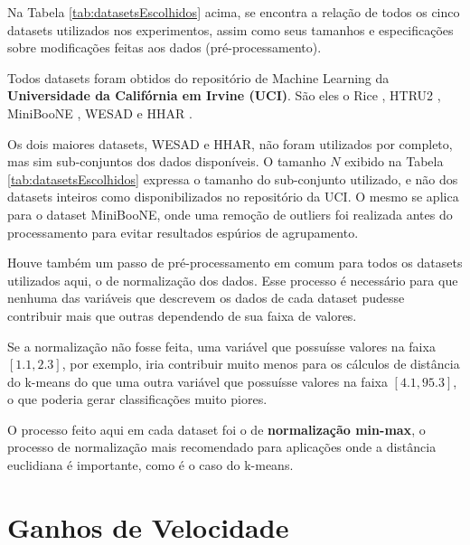 \documentclass[12pt,
openright, 
oneside, %
a4paper,    %
brazil]{facom-ufu-abntex2}
\begin{document}
Na Tabela \ref{tab:datasetsEscolhidos} acima, se encontra a relação de todos os cinco datasets utilizados nos experimentos, assim como seus tamanhos e especificações sobre modificações feitas aos dados (pré-processamento).

Todos datasets foram obtidos do repositório de Machine Learning da \textbf{Universidade da Califórnia em Irvine (UCI)}. São eles o Rice \cite{riceDataset}, HTRU2 \cite{htru2Dataset}, MiniBooNE \cite{minibooneDataset}, WESAD \cite{wesadDataset} e HHAR \cite{htru2Dataset}.

Os dois maiores datasets, WESAD e HHAR, não foram utilizados por completo, mas sim sub-conjuntos dos dados disponíveis. O tamanho $N$ exibido na Tabela \ref{tab:datasetsEscolhidos} expressa o tamanho do sub-conjunto utilizado, e não dos datasets inteiros como disponibilizados no repositório da UCI. O mesmo se aplica para o dataset MiniBooNE, onde uma remoção de outliers foi realizada antes do processamento para evitar resultados espúrios de agrupamento.

Houve também um passo de pré-processamento em comum para todos os datasets utilizados aqui, o de normalização dos dados. Esse processo é necessário para que nenhuma das variáveis que descrevem os dados de cada dataset pudesse contribuir mais que outras dependendo de sua faixa de valores.

Se a normalização não fosse feita, uma variável que possuísse valores na faixa $[1.1, 2.3]$, por exemplo, iria contribuir muito menos para os cálculos de distância do k-means do que uma outra variável que possuísse valores na faixa $[4.1, 95.3]$, o que poderia gerar classificações muito piores.

O processo feito aqui em cada dataset foi o de \textbf{normalização min-max}, o processo de normalização mais recomendado \cite{standardizOfVars1988} para aplicações onde a distância euclidiana é importante, como é o caso do k-means.








\section{Ganhos de Velocidade}
\label{sec:resultados}
\end{document}

